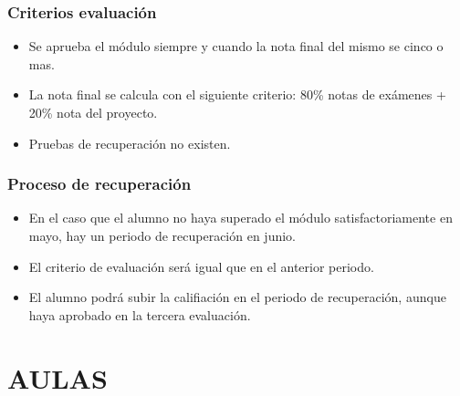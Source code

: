 \documentclass{beamer}
\begin{document}
\begin{frame}
\frametitle{Criterios evaluación}
\begin{itemize}[<+-| alert@+>]
\item Se aprueba el módulo siempre y cuando la nota final del mismo se cinco o mas.
\item La nota final se calcula con el siguiente criterio: 80\% notas de exámenes +  20\% nota del proyecto.
\item Pruebas de recuperación no existen. 
\end{itemize}
\pause
\end{frame}




\begin{frame}
\frametitle{Proceso de recuperación}
\begin{itemize}[<+-| alert@+>]
\item En el caso que el alumno no haya superado el módulo satisfactoriamente en mayo, hay un periodo de recuperación en junio.
\item El criterio de evaluación será igual que en el anterior periodo.
\item El alumno podrá subir la califiación en el periodo de recuperación, aunque haya aprobado en la tercera evaluación.
\end{itemize}
\pause
\end{frame}



\section{AULAS}
\end{document}
